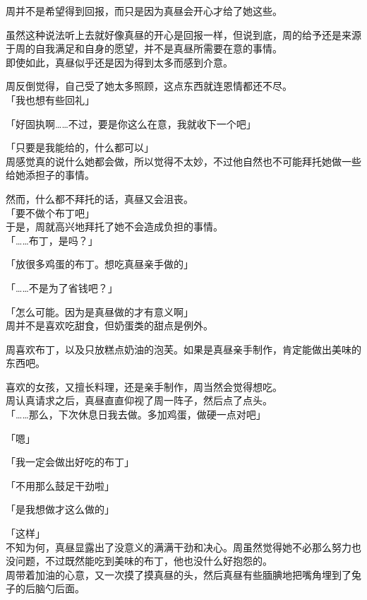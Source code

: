 周并不是希望得到回报，而只是因为真昼会开心才给了她这些。

虽然这种说法听上去就好像真昼的开心是回报一样，但说到底，周的给予还是来源于周的自我满足和自身的愿望，并不是真昼所需要在意的事情。\\

即使如此，真昼似乎还是因为得到太多而感到介意。

周反倒觉得，自己受了她太多照顾，这点东西就连恩情都还不尽。\\

「我也想有些回礼」

「好固执啊……不过，要是你这么在意，我就收下一个吧」

「只要是我能给的，什么都可以」\\

周感觉真的说什么她都会做，所以觉得不太妙，不过他自然也不可能拜托她做一些给她添担子的事情。

然而，什么都不拜托的话，真昼又会沮丧。\\

「要不做个布丁吧」\\

于是，周就高兴地拜托了她不会造成负担的事情。\\

「……布丁，是吗？」

「放很多鸡蛋的布丁。想吃真昼亲手做的」

「……不是为了省钱吧？」

「怎么可能。因为是真昼做的才有意义啊」\\

周并不是喜欢吃甜食，但奶蛋类的甜点是例外。

周喜欢布丁，以及只放糕点奶油的泡芙。如果是真昼亲手制作，肯定能做出美味的东西吧。

喜欢的女孩，又擅长料理，还是亲手制作，周当然会觉得想吃。\\

周认真请求之后，真昼直直仰视了周一阵子，然后点了点头。\\

「……那么，下次休息日我去做。多加鸡蛋，做硬一点对吧」

「嗯」

「我一定会做出好吃的布丁」

「不用那么鼓足干劲啦」

「是我想做才这么做的」

「这样」\\

不知为何，真昼显露出了没意义的满满干劲和决心。周虽然觉得她不必那么努力也没问题，不过既然能吃到美味的布丁，他也没什么好抱怨的。\\

周带着加油的心意，又一次摸了摸真昼的头，然后真昼有些腼腆地把嘴角埋到了兔子的后脑勺后面。
